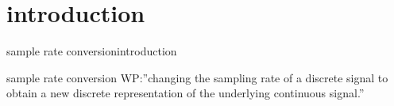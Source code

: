 



\subtitle{Part 18: Sample Rate Conversion (SRC)}


	

\section[intro]{introduction}
	\begin{frame}{sample rate conversion}{introduction }
        \vspace{-3mm}
        \begin{block}{sample rate conversion}
            WP:''changing the sampling rate of a discrete signal to obtain a new discrete representation of the underlying continuous signal.''
        \end{block}
        \vspace{30mm}    
	\end{frame}

